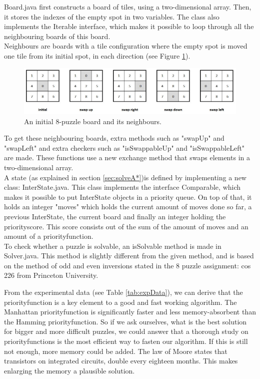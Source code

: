 \documentclass[12pt,a4paper,oneside]{article}
\begin{document}
Board.java first constructs a board of tiles, using a two-dimensional array. Then, it stores the indexes of the empty spot in two variables. The class also implements the Iterable interface, which makes it possible to loop through all the neighbouring boards of this board.\\
Neighbours are boards with a tile configuration where the empty spot is moved one tile from its initial spot, in each direction (see Figure \ref{fig:8-puz_neighbours}).
\begin{figure}[H]
	\centering
	\includegraphics[scale=0.75]{8-puz_neighbours.jpg} 
	\caption{An initial 8-puzzle board and its neighbours.}
	\label{fig:8-puz_neighbours}
\end{figure}

To get these neighbouring boards, extra methods such as "swapUp" and "swapLeft" and extra checkers such as "isSwappableUp" and "isSwappableLeft" are made. These functions use a new exchange method that swaps elements in a two-dimensional array.\\

A state (as explained in section \ref{sec:solveA*})is defined by implementing a new class: InterState.java. This class implements the interface Comparable, which makes it possible to put InterState objects in a priority queue. On top of that, it holds an integer "moves" which holds the current amount of moves done so far, a previous InterState, the current board and finally an integer holding the priorityscore. This score consists out of the sum of the amount of moves and an amount of a priorityfunction. \\

To check whether a puzzle is solvable, an isSolvable method is made in Solver.java. This method is slightly different from the given method, and is based on the method of odd and even inversions stated in the 8 puzzle assignment: cos 226 from Princeton University\cite{princetonPuzzle}.

From the experimental data (see Table \ref{tab:expData}), we can derive that the priorityfunction is a key element to a good and fast working algorithm. The Manhattan priorityfunction is significantly faster and less memory-absorbent than the Hamming priorityfunction. So if we ask ourselves, what is the best solution for bigger and more difficult puzzles, we could answer that a thorough study on priorityfunctions is the most efficient way to fasten our algorithm. If this is still not enough, more memory could be added. The law of Moore\citep{MooreLaw} states that transistors on integrated circuits, double every eighteen months. This makes enlarging the memory a plausible solution. 
\newpage
\end{document}

